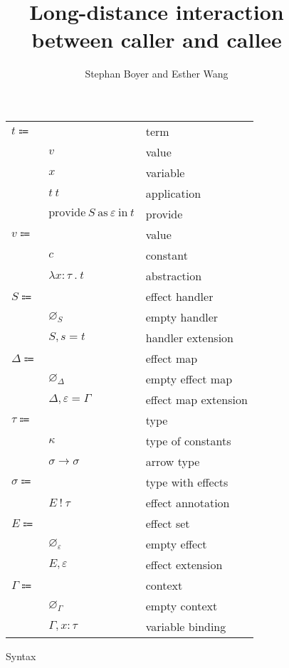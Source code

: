 \documentclass[12pt]{article}
\title{Long-distance interaction \\ between caller and callee}
\author{Stephan Boyer and Esther Wang}
\date{}
\newcommand\eterm{t}
\newcommand\evalue{v}
\newcommand\econst{c}
\newcommand\evar{x}
\newcommand\eabs[2]{\lambda #1 \ . \ #2}
\newcommand\eapp[2]{#1 \ #2}
\newcommand\eprovide[3]{\text{provide} \ #1 \ \text{as} \ #2 \ \text{in} \ #3}
\newcommand\pall{S}
\newcommand\pname{s}
\newcommand\pitem[2]{#1 = #2}
\newcommand\pempty{\varnothing_{\pall}}
\newcommand\pextend[2]{#1, #2}
\newcommand\ttype{\tau}
\newcommand\tconst{\kappa}
\newcommand\tarrow[2]{#1 \rightarrow #2}
\newcommand\tanno[2]{#1 : #2}
\newcommand\twithx{\sigma}
\newcommand\tx[2]{#1 \ ! \ #2}
\newcommand\xeffect{\varepsilon}
\newcommand\xeffects{E}
\newcommand\xempty{\varnothing_{\xeffect}}
\newcommand\xextend[2]{#1, #2}
\newcommand\xmap{\Delta}
\newcommand\xmapempty{\varnothing_{\xmap}}
\newcommand\xmapextend[2]{#1, #2}
\newcommand\xmapitem[2]{#1 = #2}
\newcommand\ccontext{\Gamma}
\newcommand\cempty{\varnothing_{\ccontext}}
\newcommand\cextend[2]{#1, #2}
\begin{document}
  \maketitle

  \begin{figure}
    \begin{mdframed}
      \begin{center}
        \begin{tabular}{l l l}
          $\eterm \Coloneqq $ & & term \\
          & $\evalue$ & value \\
          & $\evar$ & variable \\
          & $\eapp{\eterm}{\eterm}$ & application \\
          & $\eprovide{\pall}{\xeffect}{\eterm}$ & provide \\
          $\evalue \Coloneqq $ & & value \\
          & $\econst$ & constant \\
          & $\eabs{\tanno{\evar}{\ttype}}{\eterm}$ & abstraction \\
          $\pall \Coloneqq$ & & effect handler \\
          & $\pempty$ & empty handler \\
          & $\pextend{\pall}{\pitem{\pname}{\eterm}}$ & handler extension \\
          $\xmap \Coloneqq$ & & effect map \\
          & $\xmapempty$ & empty effect map \\
          & $\xmapextend{\xmap}{\xmapitem{\xeffect}{\ccontext}}$ & effect map extension \\
          $\ttype \Coloneqq$ & & type \\
          & $\tconst$ & type of constants \\
          & $\tarrow{\twithx}{\twithx}$ & arrow type \\
          $\twithx \Coloneqq$ & & type with effects \\
          & $\tx{\xeffects}{\ttype}$ & effect annotation \\
          $\xeffects \Coloneqq$ & & effect set \\
          & $\xempty$ & empty effect \\
          & $\xextend{\xeffects}{\xeffect}$ & effect extension \\
          $\ccontext \Coloneqq$ & & context \\
          & $\cempty$ & empty context \\
          & $\cextend{\ccontext}{\tanno{\evar}{\ttype}}$ & variable binding \\
        \end{tabular}
      \end{center}

      \caption{Syntax}
      \label{fig:syntax}
    \end{mdframed}
  \end{figure}
\end{document}
